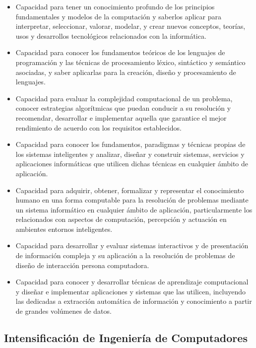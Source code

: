 \documentclass{pre-tfg}
\begin{document}
\begin{itemize}
\item Capacidad para tener un conocimiento profundo de los principios fundamentales y
  modelos de la computación y saberlos aplicar para interpretar, seleccionar, valorar,
  modelar, y crear nuevos conceptos, teorías, usos y desarrollos tecnológicos relacionados
  con la informática.
\item Capacidad para conocer los fundamentos teóricos de los lenguajes de programación y
  las técnicas de procesamiento léxico, sintáctico y semántico asociadas, y saber
  aplicarlas para la creación, diseño y procesamiento de lenguajes.
\item Capacidad para evaluar la complejidad computacional de un problema, conocer
  estrategias algorítmicas que puedan conducir a su resolución y recomendar, desarrollar e
  implementar aquella que garantice el mejor rendimiento de acuerdo con los requisitos
  establecidos.
\item Capacidad para conocer los fundamentos, paradigmas y técnicas propias de los
  sistemas inteligentes y analizar, diseñar y construir sistemas, servicios y aplicaciones
  informáticas que utilicen dichas técnicas en cualquier ámbito de aplicación.
\item Capacidad para adquirir, obtener, formalizar y representar el conocimiento humano en
  una forma computable para la resolución de problemas mediante un sistema informático en
  cualquier ámbito de aplicación, particularmente los relacionados con aspectos de
  computación, percepción y actuación en ambientes entornos inteligentes.
\item Capacidad para desarrollar y evaluar sistemas interactivos y de presentación de
  información compleja y su aplicación a la resolución de problemas de diseño de
  interacción persona computadora.
\item Capacidad para conocer y desarrollar técnicas de aprendizaje computacional y diseñar
  e implementar aplicaciones y sistemas que las utilicen, incluyendo las dedicadas a
  extracción automática de información y conocimiento a partir de grandes volúmenes de
  datos.
\end{itemize}


\subsection*{Intensificación de Ingeniería de Computadores}
\end{document}
